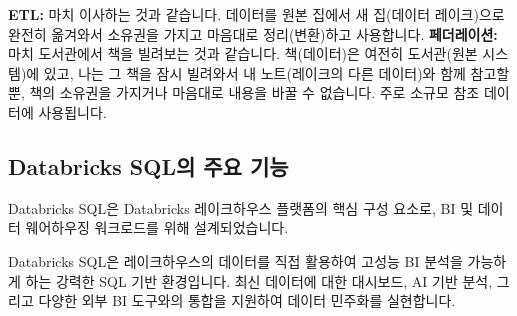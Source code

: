 \documentclass[11pt,a4paper]{article}
\theoremstyle{definition}
\begin{document}
\begin{examplebox}[title=페더레이션과 ETL의 차이]
\textbf{ETL:} 마치 이사하는 것과 같습니다. 데이터를 원본 집에서 새 집(데이터 레이크)으로 완전히 옮겨와서 소유권을 가지고 마음대로 정리(변환)하고 사용합니다.
\textbf{페더레이션:} 마치 도서관에서 책을 빌려보는 것과 같습니다. 책(데이터)은 여전히 도서관(원본 시스템)에 있고, 나는 그 책을 잠시 빌려와서 내 노트(레이크의 다른 데이터)와 함께 참고할 뿐, 책의 소유권을 가지거나 마음대로 내용을 바꿀 수 없습니다. 주로 소규모 참조 데이터에 사용됩니다.
\end{examplebox}

\subsection{Databricks SQL의 주요 기능}
Databricks SQL은 Databricks 레이크하우스 플랫폼의 핵심 구성 요소로, BI 및 데이터 웨어하우징 워크로드를 위해 설계되었습니다.

\begin{summarybox}[title=핵심 요약: 레이크하우스의 BI 엔진]
Databricks SQL은 레이크하우스의 데이터를 직접 활용하여 고성능 BI 분석을 가능하게 하는 강력한 SQL 기반 환경입니다. 최신 데이터에 대한 대시보드, AI 기반 분석, 그리고 다양한 외부 BI 도구와의 통합을 지원하여 데이터 민주화를 실현합니다.
\end{summarybox}
\end{document}
